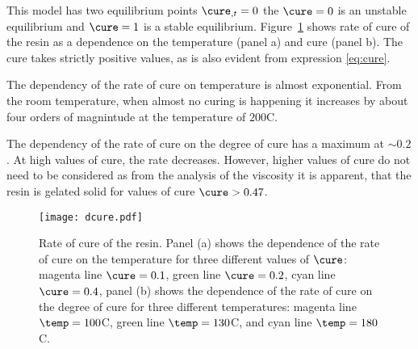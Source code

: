 \documentclass[twoside,a4paper,12pt,draft]{article}
\newcommand{\figref}[1]{Figure~\ref{#1}}
\begin{document}
This model has two equilibrium points $\cure_{,t}=0$ the $\cure = 0$ is an unstable equilibrium and $\cure=1$ is a stable equilibrium. \figref{fig:cure} shows rate of cure of the resin as a dependence on the temperature (panel a) and cure (panel b). The cure takes strictly positive values, as is also evident from expression \eqref{eq:cure}. 

The dependency of the rate of cure on temperature is almost exponential. From the room temperature, when almost no curing is happening it increases by about four orders of magnintude at the temperature of $200$\degree C.

The dependency of the rate of cure on the degree of cure has a maximum at $\sim 0.2$. At high values of cure, the rate decreases. However, higher values of cure do not need to be considered as from the analysis of the viscosity it is apparent, that the resin is gelated solid for values of cure $\cure > 0.47$.

\begin{figure}
  \centering
  \texttt{[image: dcure.pdf]}
  \caption{Rate of cure of the resin. Panel (a) shows the dependence of the
    rate of cure on the temperature for three different values of
    $\cure$: magenta line $\cure=0.1$, green line $\cure=0.2$, cyan
    line $\cure=0.4$, panel (b) shows the dependence of the rate of cure 
    on the degree of cure for three different temperatures: magenta
    line $\temp = 100$\degree C, green line $\temp = 130$\degree C, and cyan line
    $\temp = 180$\degree C.}
  \label{fig:cure}
\end{figure}
\end{document}
